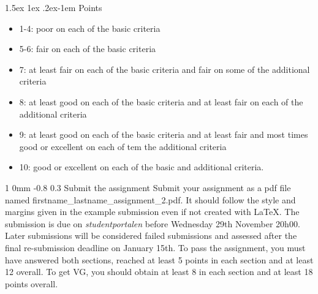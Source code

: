 \documentclass[11pt]{article}
\makeatletter
\renewcommand{\section}{\@startsection
{section}%
{1}%
{0mm}%
{-0.8\baselineskip}%
{0.3\baselineskip}%
{\bfseries\large}}%
\renewcommand{\paragraph}{%
  \@startsection{paragraph}{4}%
  {\z@}{1.5ex \@plus 1ex \@minus .2ex}{-1em}%
  {\normalfont\normalsize\bfseries}%
}\makeatother
\newenvironment{titlemize}[1]{%
    \paragraph{#1}
    \begin{itemize}
        \setlength\itemsep{0pt}}
    {\end{itemize}}
\makeatother
\begin{document}
\begin{titlemize}{Points}
    \item 1-4: poor on each of the basic criteria
    \item 5-6: fair on each of the basic criteria
    \item 7: at least fair on each of the basic criteria and fair on some of
        the additional criteria
    \item 8: at least good on each of the basic criteria and at least fair on
        each of the additional criteria
    \item 9: at least good on each of the basic criteria and at least fair and
        most times good or excellent on each of tem the additional criteria
    \item 10: good or excellent on each of the basic and additional criteria.
\end{titlemize}

\section{Submit the assignment}
\noindent
Submit your assignment as a pdf file named
firstname\_lastname\_assignment\_2.pdf. It should follow the style and
margins given in the example submission even if not created with
LaTeX. The submission is due on \textit{studentportalen} before
Wednesday 29th November 20h00. Later submissions will be considered
failed submissions and assessed after the final re-submission deadline
on January 15th. To pass the assignment, you must have answered both
sections, reached at least 5 points in each section and at least 12
overall. To get VG, you should obtain at least 8 in each section and
at least 18 points overall.     
\end{document}
